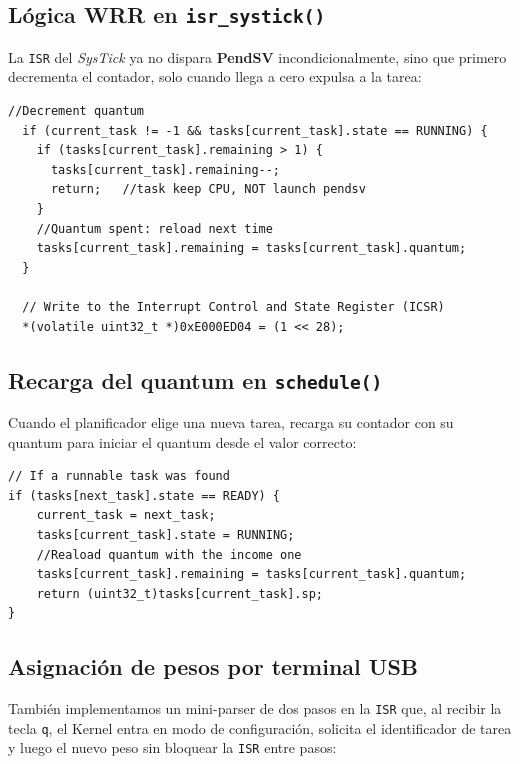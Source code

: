 \documentclass[12pt,letterpaper]{article}
\begin{document}
\subsection*{Lógica WRR en \texttt{isr\_systick()}}
La \texttt{ISR} del \textit{SysTick} ya no dispara \textbf{PendSV} incondicionalmente, sino que primero decrementa el contador, solo cuando llega a cero expulsa a la tarea:
 
\begin{lstlisting}[style=modernc, caption={Control del quantum en \texttt{isr\_systick()} --- \texttt{scheduler.c}}]
//Decrement quantum
  if (current_task != -1 && tasks[current_task].state == RUNNING) {
    if (tasks[current_task].remaining > 1) {
      tasks[current_task].remaining--;
      return;   //task keep CPU, NOT launch pendsv
    }
    //Quantum spent: reload next time
    tasks[current_task].remaining = tasks[current_task].quantum;
  }
  
  // Write to the Interrupt Control and State Register (ICSR)
  *(volatile uint32_t *)0xE000ED04 = (1 << 28);
\end{lstlisting}
 
\subsection*{Recarga del quantum en \texttt{schedule()}}
Cuando el planificador elige una nueva tarea, recarga su contador con su quantum para iniciar el quantum desde el valor correcto:
 
\begin{lstlisting}[style=modernc, caption={Recarga del quantum al seleccionar tarea en \texttt{schedule()}}]
// If a runnable task was found
if (tasks[next_task].state == READY) {
    current_task = next_task;
    tasks[current_task].state = RUNNING;
    //Reaload quantum with the income one
    tasks[current_task].remaining = tasks[current_task].quantum;
    return (uint32_t)tasks[current_task].sp;
}
\end{lstlisting}
 
\subsection*{Asignación de pesos por terminal USB}
 
También implementamos un mini-parser de dos pasos en la \texttt{ISR} que, al recibir la tecla \texttt{q}, el Kernel entra en modo de configuración, solicita el identificador de tarea y luego el nuevo peso sin bloquear la \texttt{ISR} entre pasos:
 
\end{document}
